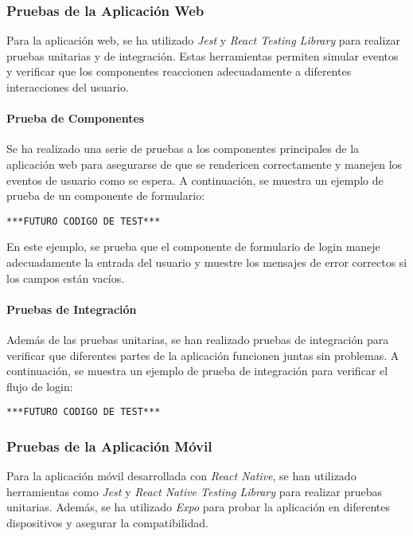 \subsubsection{Pruebas de la Aplicación Web}
Para la aplicación web, se ha utilizado \textit{Jest} y \textit{React Testing Library} para realizar pruebas unitarias y de integración. Estas herramientas permiten simular eventos y verificar que los componentes reaccionen adecuadamente a diferentes interacciones del usuario.

\paragraph{Prueba de Componentes}
Se ha realizado una serie de pruebas a los componentes principales de la aplicación web para asegurarse de que se rendericen correctamente y manejen los eventos de usuario como se espera. A continuación, se muestra un ejemplo de prueba de un componente de formulario:

\begin{verbatim}
***FUTURO CODIGO DE TEST***
\end{verbatim}

En este ejemplo, se prueba que el componente de formulario de login maneje adecuadamente la entrada del usuario y muestre los mensajes de error correctos si los campos están vacíos.

\paragraph{Pruebas de Integración}
Además de las pruebas unitarias, se han realizado pruebas de integración para verificar que diferentes partes de la aplicación funcionen juntas sin problemas. A continuación, se muestra un ejemplo de prueba de integración para verificar el flujo de login:

\begin{verbatim}
***FUTURO CODIGO DE TEST***
\end{verbatim}

\subsubsection{Pruebas de la Aplicación Móvil}
Para la aplicación móvil desarrollada con \textit{React Native}, se han utilizado herramientas como \textit{Jest} y \textit{React Native Testing Library} para realizar pruebas unitarias. Además, se ha utilizado \textit{Expo} para probar la aplicación en diferentes dispositivos y asegurar la compatibilidad.

